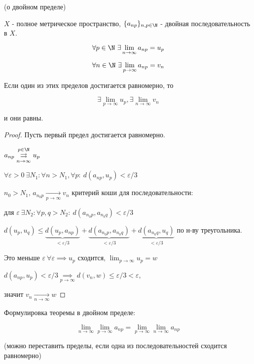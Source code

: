   \begin{theorem} %
    (о двойном пределе)

    $X$ - полное метрическое пространство,
    $\{a_{np}\}_{n,p \in \N}$ - двойная последовательность в $X$.

    $$\forall p \in \N \ \exists \lim_{n\to\infty}a_{np} = u_p$$

    $$\forall n \in \N \ \exists \lim_{p\to\infty}a_{np} = v_n$$

    Если один из этих пределов достигается равномерно, то 

    $$ \exists\lim_{p\to\infty} u_p, \exists \lim_{n\to\infty}v_n$$

    и они равны.
  \end{theorem}
  \begin{proof}
    Пусть первый предел достигается равномерно.

    $a_{np}\underset{n \to \infty}{\overset{p\in\N}{\rightrightarrows}} u_p$

    $\forall \varepsilon > 0 \ \exists N_1: \forall n > N_1, \forall p: \ d(a_{np}, u_p) < \varepsilon  / 3$

    $n_0 > N_1$, $a_{n_0p} \underset{p\to\infty}{\longrightarrow} v_n$ критерий коши для последовательности:

    для $\varepsilon\ \exists N_2: \forall p, q > N_2: \ d(a_{n_0p}, a_{n_0q}) < \varepsilon / 3$

    $d(u_p, u_q) \le \underbrace{d(u_p, a_{np})}_{< \varepsilon/3} + \underbrace{d(a_{n_0p}, a_{n_0q})}_{<\varepsilon/3} + \underbrace{d(a_{n_0q}, u_q)}_{<\varepsilon/3}$ по н-ву треугольника.

    Это меньше $\varepsilon \ \forall \varepsilon \implies u_p$ сходится, $\lim_{p\to\infty} u_p = w$

    $d(a_{np}, u_p) < \varepsilon / 3 \underset{p\to\infty}{\implies} d(v_n, w) \le \varepsilon / 3 < \varepsilon$,

    значит $v_n \underset{{n\to\infty}}{\longrightarrow} w$
  \end{proof}

  \begin{remark}
    Формулировка теоремы в двойном пределе:
    
    $$\lim_{n\to\infty}\lim_{p\to\infty} a_{np} = \lim_{p\to\infty}\lim_{n\to\infty} a_{np}$$
  
    (можно переставить пределы, если одна из последовательностей сходится равномерно)
  \end{remark}

